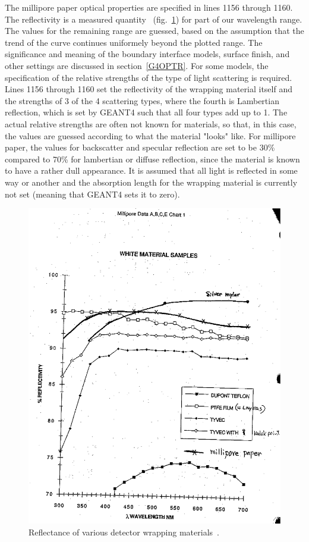 The millipore paper optical properties are specified in lines 1156
through 1160. The reflectivity is a measured quantity~\cite{PC:LLEE}
(fig.~\ref{fig:REFLECTANCE}) for part of our wavelength range. The
values for the remaining range are guessed, based on the assumption
that the trend of the curve continues uniformely beyond the plotted
range. The significance and meaning of the boundary interface models,
surface finish, and other settings are discussed in
section~\ref{G4OPTR}.  For some models, the specification of the
relative strengths of the type of light scattering is required. Lines
1156 through 1160 set the reflectivity of the wrapping material itself
and the strengths of 3 of the 4 scattering types, where the fourth is
Lambertian reflection, which is set by GEANT4 such that all four types
add up to 1. The actual relative strengths are often not known for
materials, so that, in this case, the values are guessed according to
what the material "looks" like. For millipore paper, the values for
backscatter and specular reflection are set to be 30\% compared to
70\% for lambertian or diffuse reflection, since the material is known
to have a rather dull appearance. It is assumed that all light is reflected
in some way or another and the absorption length for the wrapping material 
is currently not set (meaning that GEANT4 sets it to zero).


\begin{figure}[h]
  \hspace{0cm}
  \includegraphics[scale=0.7]{./figures5/Wrapping-Material-Reflectance.eps}
  \caption{Reflectance of various detector wrapping materials~\cite{PC:LLEE}.}
           \label{fig:REFLECTANCE}
\end{figure}

